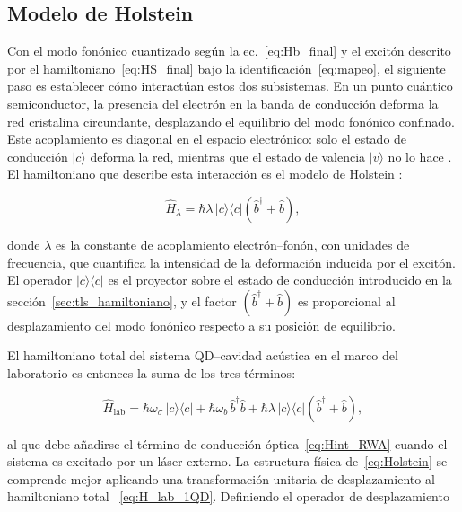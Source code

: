 \subsection{Modelo de Holstein}
\label{sec:holstein}

Con el modo fonónico cuantizado según la ec.~\eqref{eq:Hb_final} y el excitón descrito por el hamiltoniano~\eqref{eq:HS_final} bajo la identificación~\eqref{eq:mapeo}, el siguiente paso es establecer cómo interactúan estos dos subsistemas. En un punto cuántico semiconductor, la presencia del electrón en la banda de conducción deforma la red cristalina circundante, desplazando el equilibrio del modo fonónico confinado. Este acoplamiento es diagonal en el espacio electrónico: solo el estado de conducción $|c\rangle$ deforma la red, mientras que el estado de valencia $|v\rangle$ no lo hace \cite{stock2011}. El hamiltoniano que describe esta interacción es el modelo de Holstein \cite{holstein1959}:

\begin{equation}
	\hat{H}_{\lambda} = \hbar\lambda\,|c\rangle\langle c|
	\left(\hat{b}^\dagger + \hat{b}\right),
	\label{eq:Holstein}
\end{equation}

donde $\lambda$ es la constante de acoplamiento electrón--fonón, con unidades de frecuencia, que cuantifica la intensidad de la deformación inducida por el excitón. El operador $|c\rangle\langle c|$ es el proyector sobre el estado de conducción introducido en la sección~\ref{sec:tls_hamiltoniano}, y el factor $(\hat{b}^\dagger + \hat{b})$ es proporcional al desplazamiento del modo fonónico respecto a su posición de equilibrio.

El hamiltoniano total del sistema QD--cavidad acústica en el marco del laboratorio es entonces la suma de los tres términos:

\begin{equation}
	\hat{H}_\text{lab} = \hbar\omega_\sigma\,|c\rangle\langle c|
	+ \hbar\omega_b\,\hat{b}^\dagger\hat{b}
	+ \hbar\lambda\,|c\rangle\langle c|\left(\hat{b}^\dagger + \hat{b}\right),
	\label{eq:H_lab_1QD}
\end{equation}

al que debe añadirse el término de conducción óptica~\eqref{eq:Hint_RWA} cuando el sistema es excitado por un láser externo. La estructura física de~\eqref{eq:Holstein} se comprende mejor aplicando una transformación unitaria de desplazamiento al hamiltoniano total ~\eqref{eq:H_lab_1QD}. Definiendo el operador de desplazamiento

